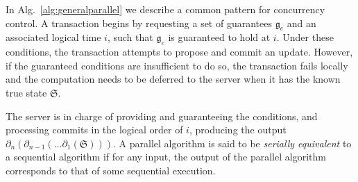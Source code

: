 \documentclass{article} %
\newcommand{\Comments}{1}
\newcommand{\note}[2]{\ifnum\Comments=1\textcolor{#1}{#2}\fi}
\newcommand{\xinghao}[1]{\note{red}{[XP: #1]}}
\newcommand{\algref}[1]{Alg.~\ref{#1}}
\begin{document}



In \algref{alg:generalparallel} we describe a common pattern for concurrency control.
A transaction begins by requesting a set of guarantees $\mathfrak{g}_e$ and an associated logical time $i$, such that $\mathfrak{g}_e$ is guaranteed to hold at $i$.
Under these conditions, the transaction attempts to propose and commit an update.
However, if the guaranteed conditions are insufficient to do so, the transaction fails locally and the computation needs to be deferred to the server when it has the known true state $\mathfrak{S}$.

The server is in charge of providing and guaranteeing the conditions, and processing commits in the logical order of $i$, producing the output $\partial_n (\partial_{n-1}(\ldots \partial_1(\mathfrak{S})))$.
A parallel algorithm is said to be \textit{serially equivalent} to a sequential algorithm if for any input, the output of the parallel algorithm corresponds to that of some sequential execution.








\end{document}
